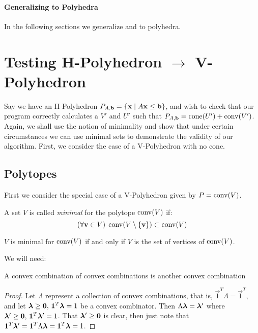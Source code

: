\paragraph{Generalizing to Polyhedra}  In the following sections we generalize  and  to polyhedra.

\section{Testing H-Polyhedron $\to$ V-Polyhedron}

Say we have an H-Polyhedron $P_{A,\mathbf{b}} = \left\{\mathbf{x}\;|\; A\mathbf{x}\leq \mathbf{b}\right\}$, and wish to check that our program correctly calculates a $V'$ and $U'$ such that $P_{A,\mathbf{b}} = \operatorname{cone}(U') + \operatorname{conv}(V')$.  Again, we shall use the notion of minimality and show that under certain circumstances we can use minimal sets to demonstrate the validity of our algorithm.  First, we consider the case of a V-Polyhedron with no cone.

\subsection{Polytopes}

First we consider the special case of a V-Polyhedron given by $P = \operatorname{conv}(V)$.

\begin{Def}
	A set $V$ is called \textit{minimal} for the polytope $\operatorname{conv}(V)$ if:
	\[(\forall \mathbf{v}\in V)\; \operatorname{conv}(V\setminus\left\{\mathbf{v}\right\}) \subset \operatorname{conv}(V)\]
\end{Def}

\begin{Prop}\label{min_conv}
	$V$ is minimal for $\operatorname{conv}(V)$ if and only if $V$ is the set of vertices of $\operatorname{conv}(V)$.
\end{Prop}

We will need:

\begin{Prop}\label{conv_conv}
	A convex combination of convex combinations is another convex combination
\end{Prop}

\begin{proof}
	Let $\Lambda$ represent a collection of convex combinations, that is, $\vec{1}^T\Lambda = \vec{1}^T$, and let $\bm{\lambda}\geq\mathbf{0},\,\mathbf{1}^T\bm{\lambda} = 1$ be a convex combinator.  Then $\Lambda\bm{\lambda} = \bm{\lambda}'$ where $\bm{\lambda}'\geq\mathbf{0},\,\mathbf{1}^T\bm{\lambda}'=1$.  That $\bm{\lambda}'\geq\mathbf{0}$ is clear, then just note that $\mathbf{1}^T\bm{\lambda}' = \mathbf{1}^T\Lambda\bm{\lambda} = \mathbf{1}^T\bm{\lambda} = 1$.
\end{proof}

